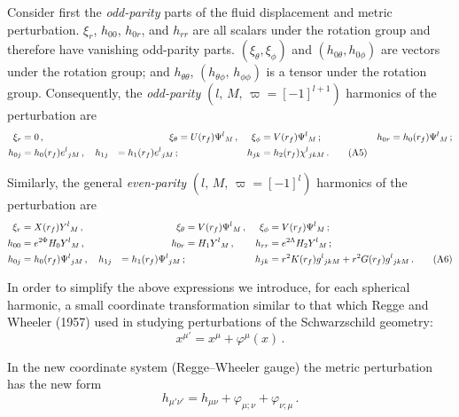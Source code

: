 
Consider first the \emph{odd-parity} parts of the fluid displacement and metric perturbation.
$\xi_r$, $h_{00}$, $h_{0r}$, and $h_{rr}$ are all scalars under the rotation group and therefore have vanishing
odd-parity parts. $(\xi_\theta, \xi_\phi)$ and $(h_{0\theta}, h_{0\phi})$ are vectors under the rotation group;
and $h_{\theta\theta}$, $(h_{\theta\phi},\, h_{\phi\phi})$ is a tensor under the rotation group.
Consequently, the \emph{odd-parity} $(l,\, M,\, \varpi = [-1]^{l+1})$ harmonics of the perturbation are
%
\begin{subequations}
\begin{align}
\xi_r &= 0 \,,
&\xi_\theta &= U(r_f)\Psi^l{}_{M} \,,
&\xi_\phi &= V(r_f)\Psi^l{}_{M} \,;
&h_{0r} &= h_0(r_f)\Psi^l{}_{M} \,;
\notag\\
h_{0j} &= h_0(r_f)e^l{}_{jM} \,,
\quad
h_{1j} &= h_1(r_f)e^l{}_{jM} \,;
&&
h_{j k} &= h_2(r_f)\chi^l{}_{jkM} \,.
\tag{A5}
\end{align}
\end{subequations}

Similarly, the general \emph{even-parity} $(l,\, M,\, \varpi = [-1]^l)$ harmonics of the perturbation are
%
\begin{subequations}
\begin{align}
\xi_r &= X(r_f)Y^l{}_{M} \,,
&\xi_\theta &= V(r_f)\Psi^l{}_{M} \,,
&\xi_\phi &= V(r_f)\Psi^l{}_{M} \,;
\notag\\
h_{00} &= e^{2\Phi}H_0 Y^l{}_{M} \,,
&h_{0r} &= H_1 Y^l{}_{M} \,,
&h_{rr} &= e^{2\Lambda}H_2 Y^l{}_{M} \,;
\notag\\
h_{0j} &= h_0(r_f)\Psi^l{}_{jM} \,,
\quad
h_{1j} &= h_1(r_f)\Psi^l{}_{jM} \,;
&&
h_{jk} &= r^2 K(r_f)g^l{}_{jkM} + r^2 G(r_f)g^l{}_{jkM} \,.
\tag{A6}
\end{align}
\end{subequations}

In order to simplify the above expressions we introduce, for each spherical harmonic, a small
coordinate transformation similar to that which Regge and Wheeler (1957) used in studying
perturbations of the Schwarzschild geometry:
%
\begin{equation}
x^{\mu'} = x^\mu + \varphi^\mu(x) \,.
\tag{A7}
\end{equation}

In the new coordinate system (Regge--Wheeler gauge) the metric perturbation has the new form
%
\begin{equation}
h_{\mu'\nu'} = h_{\mu\nu} + \varphi_{\mu;\nu} + \varphi_{\nu;\mu} \,.
\tag{A8}
\end{equation}

